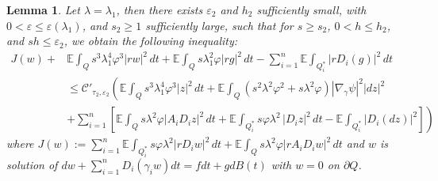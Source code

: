 \documentclass[11pt,oneside,leqno]{amsart}
\numberwithin{equation}{section}
\numberwithin{equation}{section}
\newcommand{\E}{\mathbb{E}}
\newtheorem{lemma}[theorem]{Lemma}
\begin{document}
\begin{lemma}\label{lem:inequalityDz-Dw}
Let $\lambda=\lambda_{1}$, then there exists $\varepsilon_{2}$ and $h_{2}$ sufficiently small, with $0<\varepsilon \leq \varepsilon(\lambda_{1})$, and $s_{2}\geq 1$ sufficiently large, such that for $s\geq s_{2}$, $0<h\leq h_{2}$, and $sh\leq \varepsilon_{2}$, we obtain the following inequality:
\begin{equation}\label{eq:estimateleftside}
\begin{split}
    J(w)+&\E\int_Q s^3\lambda^4_{1}\varphi^3|rw|^2\,dt+\E\int_{Q}s\lambda^2_{1}\varphi|rg|^2\,dt-\sum_{i=1}^{n}\E\int_{Q_i^{\ast}}|rD_i(g)|^2\,dt\\
    &\leq \mathcal{C}'_{\tau_2,\varepsilon_2}\left(\E\int_Qs^3\lambda^4_{1}\varphi^3|z|^2\,dt+\E\int_{Q}(s^2\lambda^2\varphi^2+s\lambda^2\varphi)|\nabla_{\gamma} \psi|^2|dz|^2\right.\\
    &\left.+\sum_{i=1}^{n} \left[\E\int_{Q}s\lambda^2\varphi|A_iD_iz|^2\,dt+\E\int_{Q_i^{\ast}}s\varphi\lambda^2\,|D_iz|^2\,dt-\E\int_{Q_i^{\ast}}|D_i(dz)|^2\right]\right)
\end{split}
\end{equation}
where $\displaystyle J(w):= \sum_{i=1}^{n}\E\int_{Q_i^{\ast}}s\varphi\lambda^2|rD_iw|^2\,dt +\E\int_{Q}s\lambda^2\varphi |rA_iD_iw|^2\,dt$ and $w$ is solution of $\displaystyle dw+\sum_{i=1}^{n}D_i(\gamma_i w)dt=fdt+gdB(t)$ with $w=0$ on $\partial Q$.
\end{lemma}
\end{document}
